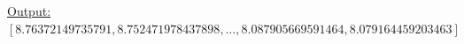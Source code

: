 \documentclass[12pt,letterpaper]{article}
\newcommand{\lrb}[1]{\left[ #1 \right]}
\begin{document}
\begin{steps}
\begin{enumerate}
    \underline{Output:}\\
    
    $
    \lrb{
    8.76372149735791,
    8.752471978437898,
    \dots,
    8.087905669591464,
    8.079164459203463
    }
    $









  \end{enumerate}
\end{steps}








\newpage

\end{document}
